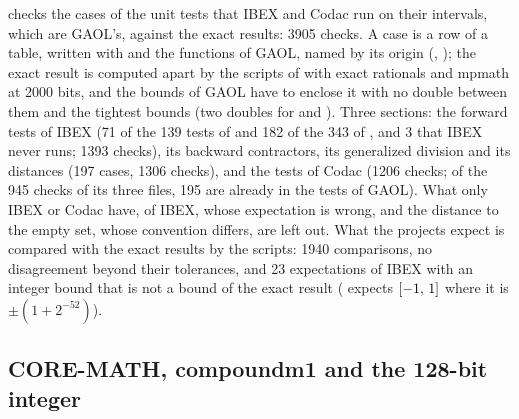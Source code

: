 \medskip
{} checks the cases of the unit tests that IBEX and
Codac run on their intervals, which are GAOL's, against the exact results:
3905 checks.\newinvfive{} A case is a row of a table, written with
 and the functions of GAOL, named by its origin
(, ); the
exact result is computed apart by the scripts of
 with exact rationals and mpmath at 2000 bits,
and the bounds of GAOL have to enclose it with no double between them and
the tightest bounds (two doubles for  and
). Three sections: the forward tests of IBEX (71 of the
139 tests of  and 182 of the 343 of ,
and 3 that IBEX never runs; 1393 checks), its backward contractors, its
generalized division and its distances (197 cases, 1306 checks), and the
tests of Codac (1206 checks; of the 945 checks of its three files, 195 are
already in the tests of GAOL). What only IBEX or Codac have,  of
IBEX, whose expectation is wrong, and the distance to the empty set, whose
convention differs, are left out. What the projects expect is compared with
the exact results by the scripts: 1940 comparisons, no disagreement beyond
their tolerances, and 23 expectations of IBEX with an integer bound that is
not a bound of the exact result ( expects $[-1,\,1]$ where it
is $\pm(1+2^{-52})$).

\subsection{CORE-MATH, compoundm1 and the 128-bit integer}

